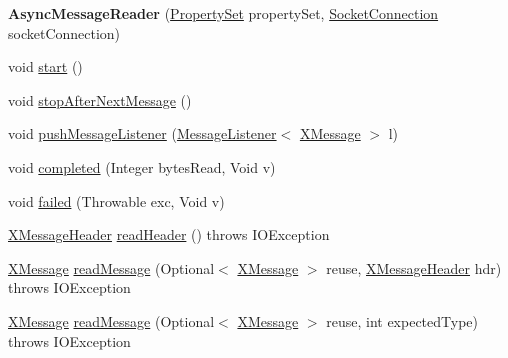 \begin{DoxyCompactItemize}
\item 
\mbox{\label{classcom_1_1mysql_1_1cj_1_1protocol_1_1x_1_1_async_message_reader_a00db6ec79141ba00ebce6e28e146d11b}} 
{\bfseries Async\+Message\+Reader} (\mbox{\hyperlink{interfacecom_1_1mysql_1_1cj_1_1conf_1_1_property_set}{Property\+Set}} property\+Set, \mbox{\hyperlink{interfacecom_1_1mysql_1_1cj_1_1protocol_1_1_socket_connection}{Socket\+Connection}} socket\+Connection)
\item 
void \mbox{\hyperlink{classcom_1_1mysql_1_1cj_1_1protocol_1_1x_1_1_async_message_reader_a703e921ede276cb42cb6088a40256eb4}{start}} ()
\item 
void \mbox{\hyperlink{classcom_1_1mysql_1_1cj_1_1protocol_1_1x_1_1_async_message_reader_a5d7ad4e6d2faa3d5fa7ca04feaf6070f}{stop\+After\+Next\+Message}} ()
\item 
void \mbox{\hyperlink{classcom_1_1mysql_1_1cj_1_1protocol_1_1x_1_1_async_message_reader_a04d85ade49b7e9bc20370600a526f5e6}{push\+Message\+Listener}} (\mbox{\hyperlink{interfacecom_1_1mysql_1_1cj_1_1protocol_1_1_message_listener}{Message\+Listener}}$<$ \mbox{\hyperlink{classcom_1_1mysql_1_1cj_1_1protocol_1_1x_1_1_x_message}{X\+Message}} $>$ l)
\item 
void \mbox{\hyperlink{classcom_1_1mysql_1_1cj_1_1protocol_1_1x_1_1_async_message_reader_a24e1c3793c356604d062932c4165b387}{completed}} (Integer bytes\+Read, Void v)
\item 
void \mbox{\hyperlink{classcom_1_1mysql_1_1cj_1_1protocol_1_1x_1_1_async_message_reader_a32777998d2ffe63d50fcaeaff9774c59}{failed}} (Throwable exc, Void v)
\item 
\mbox{\hyperlink{classcom_1_1mysql_1_1cj_1_1protocol_1_1x_1_1_x_message_header}{X\+Message\+Header}} \mbox{\hyperlink{classcom_1_1mysql_1_1cj_1_1protocol_1_1x_1_1_async_message_reader_a6c755b53680af84a699114422348db84}{read\+Header}} ()  throws I\+O\+Exception 
\item 
\mbox{\hyperlink{classcom_1_1mysql_1_1cj_1_1protocol_1_1x_1_1_x_message}{X\+Message}} \mbox{\hyperlink{classcom_1_1mysql_1_1cj_1_1protocol_1_1x_1_1_async_message_reader_afd39b008eb7407f677e2e36f6ac640a6}{read\+Message}} (Optional$<$ \mbox{\hyperlink{classcom_1_1mysql_1_1cj_1_1protocol_1_1x_1_1_x_message}{X\+Message}} $>$ reuse, \mbox{\hyperlink{classcom_1_1mysql_1_1cj_1_1protocol_1_1x_1_1_x_message_header}{X\+Message\+Header}} hdr)  throws I\+O\+Exception 
\item 
\mbox{\hyperlink{classcom_1_1mysql_1_1cj_1_1protocol_1_1x_1_1_x_message}{X\+Message}} \mbox{\hyperlink{classcom_1_1mysql_1_1cj_1_1protocol_1_1x_1_1_async_message_reader_a10b24093eb7fc6fdb4b5e3a68b0b18a2}{read\+Message}} (Optional$<$ \mbox{\hyperlink{classcom_1_1mysql_1_1cj_1_1protocol_1_1x_1_1_x_message}{X\+Message}} $>$ reuse, int expected\+Type)  throws I\+O\+Exception 
\end{DoxyCompactItemize}



